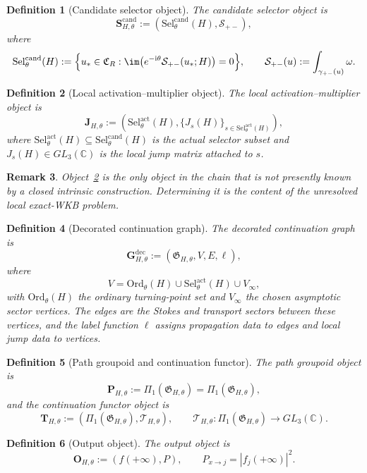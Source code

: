 \documentclass[11pt]{article}
\newcommand{\C}{\mathbb C}
\newcommand{\ii}{\mathrm{i}}
\newcommand{\CRam}{\mathfrak C_R}
\newcommand{\Selcand}{\mathrm{Sel}^{\mathrm{cand}}_{\theta}(H)}
\newcommand{\Selact}{\mathrm{Sel}^{\mathrm{act}}_{\theta}(H)}
\newcommand{\Graph}{\mathfrak G_{H,\theta}}
\newcommand{\Tfun}{\mathcal T_{H,\theta}}
\newcommand{\PathGpd}{\Pi_1(\Graph)}
\newcommand{\Ord}{\mathrm{Ord}_{\theta}(H)}
\newtheorem{definition}{Definition}[section]
\newtheorem{remark}[definition]{Remark}
\begin{document}
\begin{definition}[Candidate selector object]
\label{def:candidate-object}
The \emph{candidate selector object} is
\[
\mathbf S^{\mathrm{cand}}_{H,\theta}:=(\Selcand,\mathcal S_{+-}),
\]
where
\[
\Selcand:=\Bigl\{u_*\in\CRam:\im\bigl(e^{-\ii\theta}\mathcal S_{+-}(u_*;H)\bigr)=0\Bigr\},
\qquad
\mathcal S_{+-}(u):=\int_{\gamma_{+-}(u)}\omega.
\]
\end{definition}

\begin{definition}[Local activation--multiplier object]
\label{def:local-jump-object}
The \emph{local activation--multiplier object} is
\[
\mathbf J_{H,\theta}:=(\Selact,\{J_s(H)\}_{s\in\Selact}),
\]
where $\Selact\subseteq \Selcand$ is the actual selector subset and $J_s(H)\in GL_3(\C)$ is the local jump matrix attached to $s$.
\end{definition}

\begin{remark}
Object~\ref{def:local-jump-object} is the only object in the chain that is not presently known by a closed intrinsic construction.  Determining it is the content of the unresolved local exact-WKB problem.
\end{remark}

\begin{definition}[Decorated continuation graph]
\label{def:graph-object}
The \emph{decorated continuation graph} is
\[
\mathbf G^{\mathrm{dec}}_{H,\theta}:=(\Graph,V,E,\ell),
\]
where
\[
V=\Ord\cup\Selact\cup V_\infty,
\]
with $\Ord$ the ordinary turning-point set and $V_\infty$ the chosen asymptotic sector vertices.  The edges are the Stokes and transport sectors between these vertices, and the label function $\ell$ assigns propagation data to edges and local jump data to vertices.
\end{definition}

\begin{definition}[Path groupoid and continuation functor]
\label{def:groupoid-functor-objects}
The \emph{path groupoid object} is
\[
\mathbf P_{H,\theta}:=\PathGpd=\Pi_1(\Graph),
\]
and the \emph{continuation functor object} is
\[
\mathbf T_{H,\theta}:=(\PathGpd,\Tfun),
\qquad
\Tfun:\PathGpd\to GL_3(\C).
\]
\end{definition}

\begin{definition}[Output object]
\label{def:output-object}
The \emph{output object} is
\[
\mathbf O_{H,\theta}:=(f(+\infty),P),
\qquad
P_{x\to j}=|f_j(+\infty)|^2.
\]
\end{definition}
\end{document}
